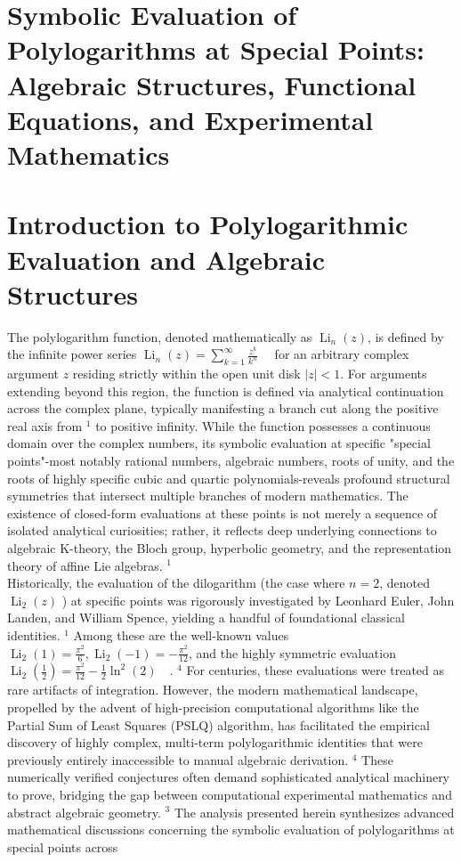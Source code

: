 \documentclass[10pt]{article}
\begin{document}
\section*{Symbolic Evaluation of Polylogarithms at Special Points: Algebraic Structures, Functional Equations, and Experimental Mathematics}
\section*{Introduction to Polylogarithmic Evaluation and Algebraic Structures}
The polylogarithm function, denoted mathematically as $\operatorname{Li}_{n}(z)$, is defined by the infinite power series $\operatorname{Li}_{n}(z)=\sum_{k=1}^{\infty} \frac{z^{k}}{k^{n}} \quad$ for an arbitrary complex argument $z$ residing strictly within the open unit disk $|z|<1$. For arguments extending beyond this region, the function is defined via analytical continuation across the complex plane, typically manifesting a branch cut along the positive real axis from ${ }^{1}$ to positive infinity. While the function possesses a continuous domain over the complex numbers, its symbolic evaluation at specific "special points"-most notably rational numbers, algebraic numbers, roots of unity, and the roots of highly specific cubic and quartic polynomials-reveals profound structural symmetries that intersect multiple branches of modern mathematics. The existence of closed-form evaluations at these points is not merely a sequence of isolated analytical curiosities; rather, it reflects deep underlying connections to algebraic K-theory, the Bloch group, hyperbolic geometry, and the representation theory of affine Lie algebras. ${ }^{1}$\\
Historically, the evaluation of the dilogarithm (the case where $n=2$, denoted $\operatorname{Li}_{2}(z)$ ) at specific points was rigorously investigated by Leonhard Euler, John Landen, and William Spence, yielding a handful of foundational classical identities. ${ }^{1}$ Among these are the well-known values $\operatorname{Li}_{2}(1)=\frac{\pi^{2}}{6}, \operatorname{Li}_{2}(-1)=-\frac{\pi^{2}}{12}$, and the highly symmetric evaluation $\operatorname{Li}_{2}\left(\frac{1}{2}\right)=\frac{\pi^{2}}{12}-\frac{1}{2} \ln ^{2}(2) \quad$. ${ }^{4}$ For centuries, these evaluations were treated as rare artifacts of integration. However, the modern mathematical landscape, propelled by the advent of high-precision computational algorithms like the Partial Sum of Least Squares (PSLQ) algorithm, has facilitated the empirical discovery of highly complex, multi-term polylogarithmic identities that were previously entirely inaccessible to manual algebraic derivation. ${ }^{4}$ These numerically verified conjectures often demand sophisticated analytical machinery to prove, bridging the gap between computational experimental mathematics and abstract algebraic geometry. ${ }^{3}$ The analysis presented herein synthesizes advanced mathematical discussions concerning the symbolic evaluation of polylogarithms at special points across\\
\end{document}
